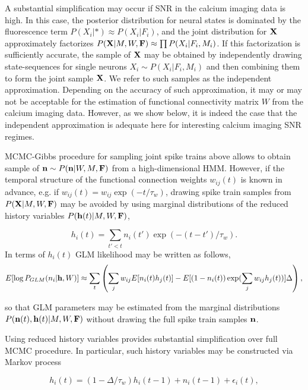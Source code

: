 A substantial simplification may occur if SNR in the calcium imaging data is high. In this case, the posterior distribution for neural states is dominated by the fluorescence term $P(X_i|*)\approx P(X_i|F_i)$, and the joint distribution for ${\bf X}$ approximately factorizes $P({\bf X}|M, W, {\bf F})\approx\prod P(X_i|F_i, M_i)$. If this factorization is sufficiently accurate, the sample of ${\bf X}$ may be obtained by independently drawing state-sequences for single neurons $X_i \sim P(X_i|F_i, M_i)$ and then combining them to form the joint sample ${\bf X}$.  We refer to such samples as the independent approximation. Depending on the accuracy of such approximation, it may or may not be acceptable for the estimation of functional connectivity matrix $W$ from the calcium imaging data. However, as we show below, it is indeed the case that the independent approximation is adequate here for interesting calcium imaging SNR regimes.

MCMC-Gibbs procedure for sampling joint spike trains above allows to obtain sample of ${\bf n}\sim P({\bf n}|W, M, {\bf F})$ from a high-dimensional HMM. However, if the temporal structure of the functional connection weights $w_{ij}(t)$ is known in advance, e.g. if $w_{ij}(t)=w_{ij}\exp(-t/\tau_w)$, drawing spike train samples from $P({\bf X}|M, W, {\bf F})$ may be avoided by using marginal distributions of the reduced history variables $P({\bf h}(t)|M, W, {\bf F})$, 

\begin{equation}
h_i(t)=\sum\limits_{t'<t} n_i(t')\exp(-(t-t')/\tau_w).
\end{equation}
In terms of $h_i(t)$ GLM likelihood may be written as follows, 
\begin{equation}
E[\log P_{GLM}(n_i|{\bf h}, W)]\approx \sum_t \left(\sum\limits_{j} w_{ij} E[n_i(t) h_j(t)] -
E[(1-n_i(t)) \exp(\sum\limits_j w_{ij}h_j(t))] \Delta \right), 
\end{equation}

so that GLM parameters may be estimated from the marginal distributions $P({\bf n}(t), {\bf h}(t)|M, W, {\bf F})$ without drawing the full spike train samples ${\bf n}$.

Using reduced history variables provides substantial simplification over full MCMC procedure. In particular, such history variables may be constructed via Markov process

\begin{equation}\label{eqn:spkhist:definition}
h_i(t)=(1-\Delta/\tau_w) h_i(t-1) + n_i(t-1) + \epsilon_i(t), 
\end{equation}

